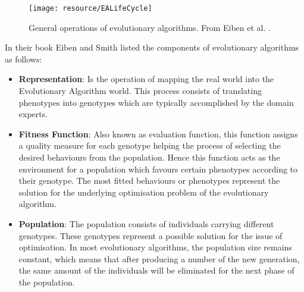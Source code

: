 \begin{figure}[!h]
	\centering
	\texttt{[image: resource/EALifeCycle]}
	\caption{General operations of evolutionary algorithms. 
		From Eiben et al. \cite{Eiben2015}.}
	\label{fig:EALifeCycle}
\end{figure}

In their book \cite{Eiben2015} Eiben and Smith listed the components of evolutionary algorithms as follows: 
\begin{itemize}
	
	\item \textbf{Representation}: Is the operation of mapping the real world into the Evolutionary Algorithm world. This process consists of translating phenotypes into genotypes which are typically accomplished by the domain experts.
	
	\item \textbf{Fitness Function}: Also known as evaluation function, this function assigns a quality measure for each genotype helping the process of selecting the desired behaviours from the population. Hence this function acts as the environment for a population which favours certain phenotypes according to their genotype. The most fitted behaviours or phenotypes represent the solution for the underlying optimisation problem of the evolutionary algorithm.
	
	\item \textbf{Population}: The population consists of individuals carrying different genotypes. These genotypes represent a possible solution for the issue of optimisation. In most evolutionary algorithms, the population size remains constant, which means that after producing a number of the new generation, the same amount of the individuals will be eliminated for the next phase of the population.
	

\end{itemize}
